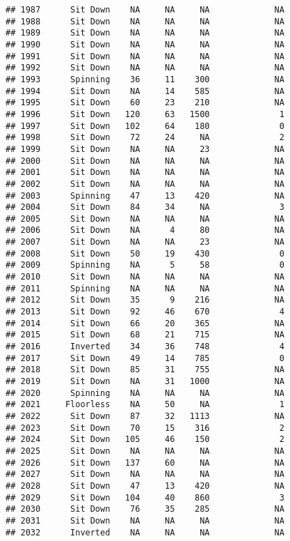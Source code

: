 \documentclass[
]{article}
\begin{document}
\begin{verbatim}
## 1987      Sit Down    NA     NA     NA             NA
## 1988      Sit Down    NA     NA     NA             NA
## 1989      Sit Down    NA     NA     NA             NA
## 1990      Sit Down    NA     NA     NA             NA
## 1991      Sit Down    NA     NA     NA             NA
## 1992      Sit Down    NA     NA     NA             NA
## 1993      Spinning    36     11    300             NA
## 1994      Sit Down    NA     14    585             NA
## 1995      Sit Down    60     23    210             NA
## 1996      Sit Down   120     63   1500              1
## 1997      Sit Down   102     64    180              0
## 1998      Sit Down    72     24     NA              2
## 1999      Sit Down    NA     NA     23             NA
## 2000      Sit Down    NA     NA     NA             NA
## 2001      Sit Down    NA     NA     NA             NA
## 2002      Sit Down    NA     NA     NA             NA
## 2003      Spinning    47     13    420             NA
## 2004      Sit Down    84     34     NA              3
## 2005      Sit Down    NA     NA     NA             NA
## 2006      Sit Down    NA      4     80             NA
## 2007      Sit Down    NA     NA     23             NA
## 2008      Sit Down    50     19    430              0
## 2009      Spinning    NA      5     58              0
## 2010      Sit Down    NA     NA     NA             NA
## 2011      Spinning    NA     NA     NA             NA
## 2012      Sit Down    35      9    216             NA
## 2013      Sit Down    92     46    670              4
## 2014      Sit Down    66     20    365             NA
## 2015      Sit Down    68     21    715             NA
## 2016      Inverted    34     36    748              4
## 2017      Sit Down    49     14    785              0
## 2018      Sit Down    85     31    755             NA
## 2019      Sit Down    NA     31   1000             NA
## 2020      Spinning    NA     NA     NA             NA
## 2021     Floorless    NA     50     NA              1
## 2022      Sit Down    87     32   1113             NA
## 2023      Sit Down    70     15    316              2
## 2024      Sit Down   105     46    150              2
## 2025      Sit Down    NA     NA     NA             NA
## 2026      Sit Down   137     60     NA             NA
## 2027      Sit Down    NA     NA     NA             NA
## 2028      Sit Down    47     13    420             NA
## 2029      Sit Down   104     40    860              3
## 2030      Sit Down    76     35    285             NA
## 2031      Sit Down    NA     NA     NA             NA
## 2032      Inverted    NA     NA     NA             NA

\end{verbatim}
\end{document}

